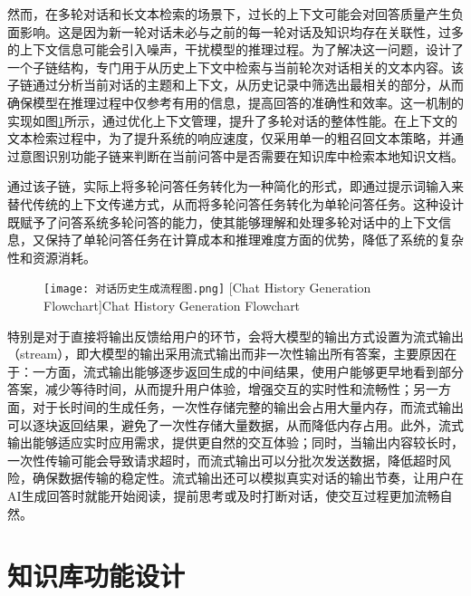 然而，在多轮对话和长文本检索的场景下，过长的上下文可能会对回答质量产生负面影响。这是因为新一轮对话未必与之前的每一轮对话及知识均存在关联性，过多的上下文信息可能会引入噪声，干扰模型的推理过程。为了解决这一问题，设计了一个子链结构，专门用于从历史上下文中检索与当前轮次对话相关的文本内容。该子链通过分析当前对话的主题和上下文，从历史记录中筛选出最相关的部分，从而确保模型在推理过程中仅参考有用的信息，提高回答的准确性和效率。这一机制的实现如图\ref{fig:多轮对话}所示，通过优化上下文管理，提升了多轮对话的整体性能。在上下文的文本检索过程中，为了提升系统的响应速度，仅采用单一的粗召回文本策略，并通过意图识别功能子链来判断在当前问答中是否需要在知识库中检索本地知识文档。

通过该子链，实际上将多轮问答任务转化为一种简化的形式，即通过提示词输入来替代传统的上下文传递方式，从而将多轮问答任务转化为单轮问答任务。这种设计既赋予了问答系统多轮问答的能力，使其能够理解和处理多轮对话中的上下文信息，又保持了单轮问答任务在计算成本和推理难度方面的优势，降低了系统的复杂性和资源消耗。

\begin{figure}[!htb]
    \centering
    \texttt{[image: 对话历史生成流程图.png]}
    [Chat History Generation Flowchart]{Chat History Generation Flowchart}
    \label{fig:多轮对话}
\end{figure}
特别是对于直接将输出反馈给用户的环节，会将大模型的输出方式设置为流式输出（stream），即大模型的输出采用流式输出而非一次性输出所有答案，主要原因在于：一方面，流式输出能够逐步返回生成的中间结果，使用户能够更早地看到部分答案，减少等待时间，从而提升用户体验，增强交互的实时性和流畅性；另一方面，对于长时间的生成任务，一次性存储完整的输出会占用大量内存，而流式输出可以逐块返回结果，避免了一次性存储大量数据，从而降低内存占用。此外，流式输出能够适应实时应用需求，提供更自然的交互体验；同时，当输出内容较长时，一次性传输可能会导致请求超时，而流式输出可以分批次发送数据，降低超时风险，确保数据传输的稳定性。流式输出还可以模拟真实对话的输出节奏，让用户在AI生成回答时就能开始阅读，提前思考或及时打断对话，使交互过程更加流畅自然。

\section{知识库功能设计}

